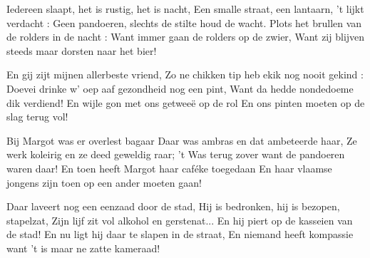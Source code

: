 \footnotemark [
ititle={Rolders in de nacht, de}]


\beginverse
Iedereen slaapt, het is rustig, het is nacht,
Een smalle straat, een lantaarn, 't lijkt verdacht :
Geen pandoeren, slechts de stilte houd de wacht.
Plots het brullen van de rolders in de nacht :
Want immer gaan de rolders op de zwier,
Want zij blijven steeds maar dorsten naar het bier!
\endverse

\beginverse
En gij zijt mijnen allerbeste vriend,
Zo ne chikken tip heb ekik nog nooit gekind :
Doevei drinke w' oep aaf gezondheid nog een pint,
Want da hedde nondedoeme dik verdiend!
En wijle gon met ons getweeë op de rol
En ons pinten moeten op de slag terug vol!
\endverse

\beginverse
Bij Margot was er overlest bagaar
Daar was ambras en dat ambeteerde haar,
Ze werk koleirig en ze deed geweldig raar;
't Was terug zover want de pandoeren waren daar!
En toen heeft Margot haar caféke toegedaan
En haar vlaamse jongens zijn toen op een ander moeten gaan!
\endverse

\beginverse
Daar laveert nog een eenzaad door de stad,
Hij is bedronken, hij is bezopen, stapelzat,
Zijn lijf zit vol alkohol en gerstenat...
En hij piert op de kasseien van de stad!
En nu ligt hij daar te slapen in de straat,
En niemand heeft kompassie want 't is maar ne zatte kameraad!
\endverse
\endsong
 